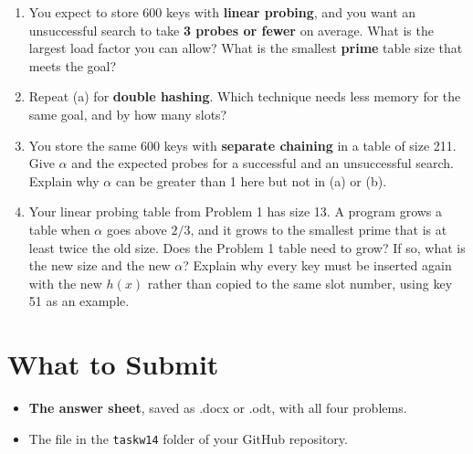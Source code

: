 \documentclass[11pt]{article}
\begin{document}
\begin{enumerate}[label=(\alph*), leftmargin=1.8em]
  \item You expect to store 600 keys with \textbf{linear probing}, and you want an
    unsuccessful search to take \textbf{3 probes or fewer} on average. What is the largest load
    factor you can allow? What is the smallest \textbf{prime} table size that meets the goal?
  \item Repeat (a) for \textbf{double hashing}. Which technique needs less memory for the same
    goal, and by how many slots?
  \item You store the same 600 keys with \textbf{separate chaining} in a table of size 211.
    Give $\alpha$ and the expected probes for a successful and an unsuccessful search. Explain
    why $\alpha$ can be greater than 1 here but not in (a) or (b).
  \item Your linear probing table from Problem 1 has size 13. A program grows a table when
    $\alpha$ goes above $2/3$, and it grows to the smallest prime that is at least twice the old
    size. Does the Problem 1 table need to grow? If so, what is the new size and the new
    $\alpha$? Explain why every key must be inserted again with the new $h(x)$ rather than
    copied to the same slot number, using key 51 as an example.
\end{enumerate}

\section{What to Submit}

\begin{itemize}[leftmargin=1.4em]
  \item \textbf{The answer sheet}, saved as .docx or .odt, with all four problems.
  \item The file in the \texttt{taskw14} folder of your GitHub repository.
\end{itemize}
\end{document}
